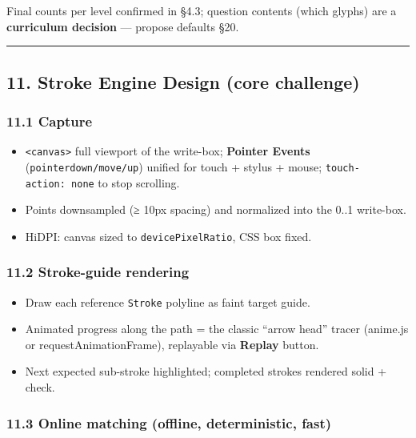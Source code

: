 \documentclass[
  11pt,
]{article}
\providecommand{\tightlist}{%
  \setlength{\itemsep}{0pt}\setlength{\parskip}{0pt}}
\begin{document}
Final counts per level confirmed in §4.3; question contents (which
glyphs) are a \textbf{curriculum decision} --- propose defaults §20.

\begin{center}\rule{0.5\linewidth}{0.5pt}\end{center}

\subsection{11. Stroke Engine Design (core
challenge)}\label{stroke-engine-design-core-challenge}

\subsubsection{11.1 Capture}\label{capture}

\begin{itemize}
\tightlist
\item
  \texttt{\textless{}canvas\textgreater{}} full viewport of the
  write-box; \textbf{Pointer Events} (\texttt{pointerdown/move/up})
  unified for touch + stylus + mouse; \texttt{touch-action:\ none} to
  stop scrolling.
\item
  Points downsampled (≥ 10px spacing) and normalized into the 0..1
  write-box.
\item
  HiDPI: canvas sized to \texttt{devicePixelRatio}, CSS box fixed.
\end{itemize}

\subsubsection{11.2 Stroke-guide
rendering}\label{stroke-guide-rendering}

\begin{itemize}
\tightlist
\item
  Draw each reference \texttt{Stroke} polyline as faint target guide.
\item
  Animated progress along the path = the classic ``arrow head'' tracer
  (anime.js or requestAnimationFrame), replayable via \textbf{Replay}
  button.
\item
  Next expected sub-stroke highlighted; completed strokes rendered solid
  + check.
\end{itemize}

\subsubsection{11.3 Online matching (offline, deterministic,
fast)}\label{online-matching-offline-deterministic-fast}
\end{document}
